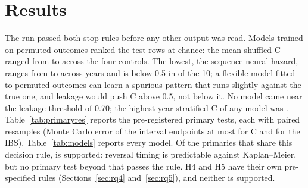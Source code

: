 \section{Results}\label{sec:results}

The run passed both stop rules before any other output was read. Models trained on permuted
outcomes ranked the test rows at chance: the mean shuffled C ranged from \ShuffledMin{} to
\ShuffledMax{} across the four controls. The lowest, the sequence neural hazard, ranges from
\ShuffledNnYearMin{} to \ShuffledNnYearMax{} across years and is below 0.5 in
\ShuffledNnYearsBelow{} of the 10; a flexible model fitted to permuted outcomes can learn a
spurious pattern that runs slightly against the true one, and leakage would push C above 0.5, not
below it. No model came near the leakage threshold of 0.70; the
highest year-stratified C of any model was \MaxModelC. Table~\ref{tab:primaryres} reports the
\PrimCount{} pre-registered primary tests, each with \PrimResamples{} paired resamples (Monte Carlo
error of the interval endpoints at most \PrimMCErrorC{} for C and \PrimMCErrorIBS{} for the IBS). Table~\ref{tab:models} reports every model.
Of the \PrimCount{} primaries that share this decision rule, \PrimSupportedCount{} is supported:
reversal timing is predictable against Kaplan--Meier, but no primary test beyond that passes the
rule. H4 and H5 have their own pre-specified rules (Sections~\ref{sec:rq4} and~\ref{sec:rq5}), and
neither is supported.

\begin{table}[!htbp]
\centering
\caption{Pre-registered primary tests, test years 2017--2026. $\Delta C$ and $\Delta$IBS are the
paired differences of the first model over the second in the year-stratified C-index and
integrated Brier score (IBS), with 95\% moving-block bootstrap intervals (blocks of 20 sessions).
A hypothesis is supported only if the $\Delta C$ interval lies above zero and the $\Delta$IBS
interval lies below zero; H1-mech requires both of its comparisons. $p$: the larger of the two
one-sided bootstrap shares in which C does not rise or the IBS does not fall, so the rule requires
$p<0.025$; Holm $p$-values adjust across the five tests of this table. KM: Kaplan--Meier.}\label{tab:primaryres}
\footnotesize
\setlength{\tabcolsep}{4pt}
\end{table}

